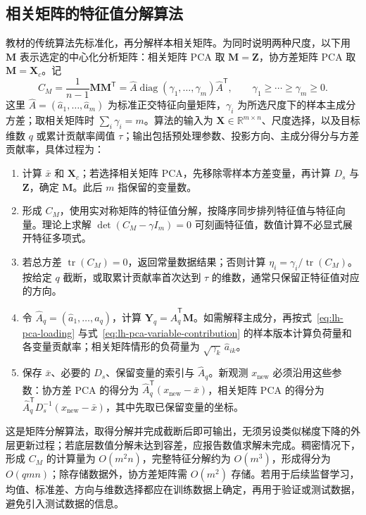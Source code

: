 \subsection{相关矩阵的特征值分解算法}
\label{subsec:lh-pca-eigendecomposition}

教材的传统算法先标准化，再分解样本相关矩阵。为同时说明两种尺度，以下用 $\mathbf M$ 表示选定的中心化分析矩阵：相关矩阵 PCA 取 $\mathbf M=\mathbf Z$，协方差矩阵 PCA 取 $\mathbf M=\mathbf X_c$。记
\[
C_M=\frac1{n-1}\mathbf M\mathbf M^{\mathsf T}
=\widehat A\operatorname{diag}(\gamma_1,\ldots,\gamma_m)\widehat A^{\mathsf T},
\qquad\gamma_1\geq\cdots\geq\gamma_m\geq0.
\]
这里 $\widehat A=(\widehat a_1,\ldots,\widehat a_m)$ 为标准正交特征向量矩阵，$\gamma_i$ 为所选尺度下的样本主成分方差；取相关矩阵时 $\sum_i\gamma_i=m$。算法的输入为 $\mathbf X\in\mathbb R^{m\times n}$、尺度选择，以及目标维数 $q$ 或累计贡献率阈值 $\tau$；输出包括预处理参数、投影方向、主成分得分与方差贡献率，具体过程为：
\begin{enumerate}
\item 计算 $\bar x$ 和 $\mathbf X_c$；若选择相关矩阵 PCA，先移除零样本方差变量，再计算 $D_s$ 与 $\mathbf Z$，确定 $\mathbf M$。此后 $m$ 指保留的变量数。
\item 形成 $C_M$，使用实对称矩阵的特征值分解，按降序同步排列特征值与特征向量。理论上求解 $\det(C_M-\gamma I_m)=0$ 可刻画特征值，数值计算不必显式展开特征多项式。
\item 若总方差 $\operatorname{tr}(C_M)=0$，返回常量数据结果；否则计算 $\eta_i=\gamma_i/\operatorname{tr}(C_M)$。按给定 $q$ 截断，或取累计贡献率首次达到 $\tau$ 的维数，通常只保留正特征值对应的方向。
\item 令 $\widehat A_q=(\widehat a_1,\ldots,\widehat a_q)$，计算 $\mathbf Y_q=\widehat A_q^{\mathsf T}\mathbf M$。如需解释主成分，再按式~\eqref{eq:lh-pca-loading} 与式~\eqref{eq:lh-pca-variable-contribution} 的样本版本计算负荷量和各变量贡献率；相关矩阵情形的负荷量为 $\sqrt{\gamma_k}\,\widehat a_{ik}$。
\item 保存 $\bar x$、必要的 $D_s$、保留变量的索引与 $\widehat A_q$。新观测 $x_{\mathrm{new}}$ 必须沿用这些参数：协方差 PCA 的得分为 $\widehat A_q^{\mathsf T}(x_{\mathrm{new}}-\bar x)$，相关矩阵 PCA 的得分为 $\widehat A_q^{\mathsf T}D_s^{-1}(x_{\mathrm{new}}-\bar x)$，其中先取已保留变量的坐标。
\end{enumerate}
这是矩阵分解算法，取得分解并完成截断后即可输出，无须另设类似梯度下降的外层更新过程；若底层数值分解未达到容差，应报告数值求解未完成。稠密情况下，形成 $C_M$ 的计算量为 $O(m^2n)$，完整特征分解约为 $O(m^3)$，形成得分为 $O(qmn)$；除存储数据外，协方差矩阵需 $O(m^2)$ 存储。若用于后续监督学习，均值、标准差、方向与维数选择都应在训练数据上确定，再用于验证或测试数据，避免引入测试数据的信息。


